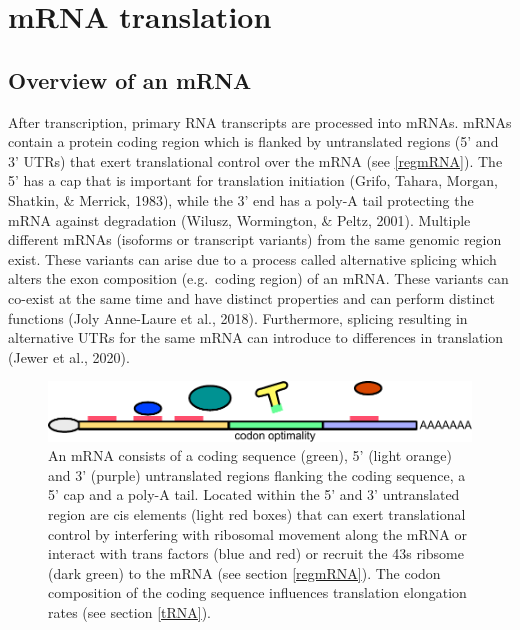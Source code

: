 \documentclass[12pt,openany]{book}
\begin{document}
\section{mRNA translation} \subsection{Overview of an mRNA} After
transcription, primary RNA transcripts are processed into mRNAs. mRNAs
contain a protein coding region which is flanked by untranslated regions
(5' and 3' UTRs) that exert translational control over the mRNA (see
\ref{regmRNA}). The 5' has a cap that is important for translation
initiation (Grifo, Tahara, Morgan, Shatkin, \& Merrick, 1983), while the
3' end has a poly-A tail protecting the mRNA against degradation
(Wilusz, Wormington, \& Peltz, 2001). Multiple different mRNAs (isoforms
or transcript variants) from the same genomic region exist. These
variants can arise due to a process called alternative splicing which
alters the exon composition (e.g.~coding region) of an mRNA. These
variants can co-exist at the same time and have distinct properties and
can perform distinct functions (Joly Anne-Laure et al., 2018).
Furthermore, splicing resulting in alternative UTRs for the same mRNA
can introduce to differences in translation (Jewer et al., 2020).

\begin{figure}
  \includegraphics{./figures/UTRFeatures.pdf}
  \caption{ An mRNA consists of a coding sequence (green), 5' (light orange) and 3' (purple) untranslated regions flanking the coding sequence, a 5' cap and a poly-A tail. Located within the 5' and 3' untranslated region are cis elements (light red boxes) that can exert translational control by interfering with ribosomal movement along the mRNA or interact with trans factors (blue and red) or recruit the 43s ribsome (dark green) to the mRNA (see section \ref{regmRNA}). The codon composition of the coding sequence influences translation elongation rates (see section \ref{tRNA}).   
 \label{fig:UTRFeat}}
\end{figure}

\clearpage
\end{document}
